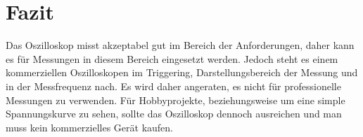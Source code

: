 \section{Fazit}

Das Oszilloskop misst akzeptabel gut im Bereich der Anforderungen, daher
kann es für Messungen in diesem Bereich eingesetzt werden.
Jedoch steht es einem kommerziellen Oszilloskopen im Triggering, Darstellungsbereich der Messung und 
in der Messfrequenz nach.
Es wird daher angeraten, es nicht für professionelle Messungen zu verwenden.
Für Hobbyprojekte, beziehungsweise um eine simple Spannungskurve zu sehen,
sollte das Oszilloskop dennoch ausreichen und man muss kein kommerzielles Gerät kaufen.